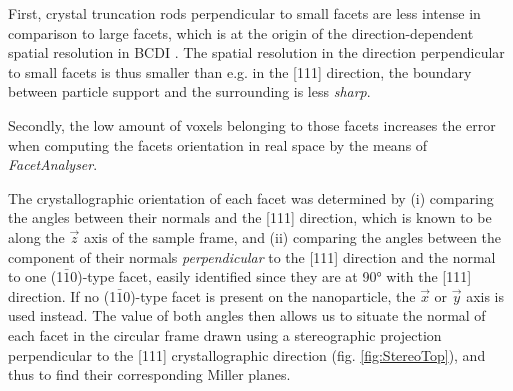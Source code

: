 
First, crystal truncation rods perpendicular to small facets are less intense in comparison to large facets, which is at the origin of the direction-dependent spatial resolution in BCDI \parencite{Cherukara2018a}.
The spatial resolution in the direction perpendicular to small facets is thus smaller than e.g. in the [111] direction, the boundary between particle support and the surrounding is less \textit{sharp}.

Secondly, the low amount of voxels belonging to those facets increases the error when computing the facets orientation in real space by the means of \textit{FacetAnalyser}.

The crystallographic orientation of each facet was determined by (i) comparing the angles between their normals and the [111] direction, which is known to be along the $\vec{z}$ axis of the sample frame, and (ii) comparing the angles between the component of their normals \textit{perpendicular} to the [111] direction and the normal to one (1$\bar{1}$0)-type facet, easily identified since they are at \ang{90} with the [111] direction.
If no (1$\bar{1}$0)-type facet is present on the nanoparticle, the $\vec{x}$ or $\vec{y}$ axis is used instead.
The value of both angles then allows us to situate the normal of each facet in the circular frame drawn using a stereographic projection perpendicular to the [111] crystallographic direction (fig. \ref{fig:StereoTop}), and thus to find their corresponding Miller planes.

